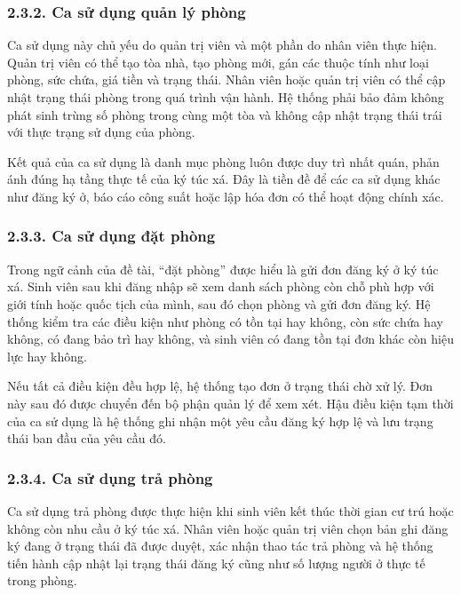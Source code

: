 \documentclass[12pt]{article}
\begin{document}
\subsubsection*{2.3.2. Ca sử dụng quản lý phòng}

Ca sử dụng này chủ yếu do quản trị viên và một phần do nhân viên thực hiện. Quản trị viên có thể tạo tòa nhà, tạo phòng mới, gán các thuộc tính như loại phòng, sức chứa, giá tiền và trạng thái. Nhân viên hoặc quản trị viên có thể cập nhật trạng thái phòng trong quá trình vận hành. Hệ thống phải bảo đảm không phát sinh trùng số phòng trong cùng một tòa và không cập nhật trạng thái trái với thực trạng sử dụng của phòng.

Kết quả của ca sử dụng là danh mục phòng luôn được duy trì nhất quán, phản ánh đúng hạ tầng thực tế của ký túc xá. Đây là tiền đề để các ca sử dụng khác như đăng ký ở, báo cáo công suất hoặc lập hóa đơn có thể hoạt động chính xác.

\subsubsection*{2.3.3. Ca sử dụng đặt phòng}

Trong ngữ cảnh của đề tài, “đặt phòng” được hiểu là gửi đơn đăng ký ở ký túc xá. Sinh viên sau khi đăng nhập sẽ xem danh sách phòng còn chỗ phù hợp với giới tính hoặc quốc tịch của mình, sau đó chọn phòng và gửi đơn đăng ký. Hệ thống kiểm tra các điều kiện như phòng có tồn tại hay không, còn sức chứa hay không, có đang bảo trì hay không, và sinh viên có đang tồn tại đơn khác còn hiệu lực hay không.

Nếu tất cả điều kiện đều hợp lệ, hệ thống tạo đơn ở trạng thái chờ xử lý. Đơn này sau đó được chuyển đến bộ phận quản lý để xem xét. Hậu điều kiện tạm thời của ca sử dụng là hệ thống ghi nhận một yêu cầu đăng ký hợp lệ và lưu trạng thái ban đầu của yêu cầu đó.

\subsubsection*{2.3.4. Ca sử dụng trả phòng}

Ca sử dụng trả phòng được thực hiện khi sinh viên kết thúc thời gian cư trú hoặc không còn nhu cầu ở ký túc xá. Nhân viên hoặc quản trị viên chọn bản ghi đăng ký đang ở trạng thái đã được duyệt, xác nhận thao tác trả phòng và hệ thống tiến hành cập nhật lại trạng thái đăng ký cũng như số lượng người ở thực tế trong phòng.
\end{document}
